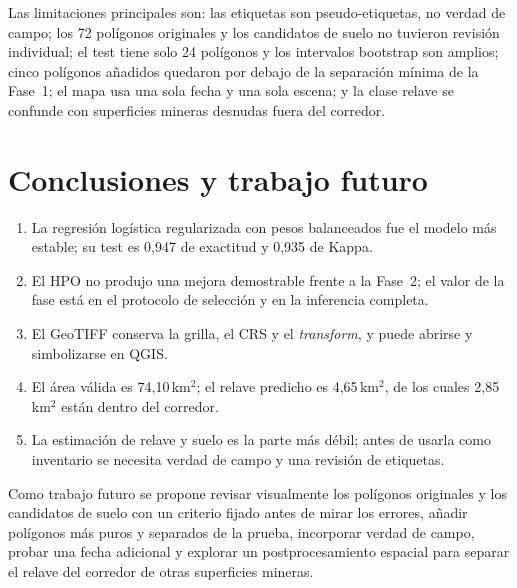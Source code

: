 \documentclass{article}
\begin{document}
Las limitaciones principales son: las etiquetas son pseudo-etiquetas, no verdad de campo; los 72 polígonos originales y los candidatos de suelo no tuvieron revisión individual; el test tiene solo 24 polígonos y los intervalos bootstrap son amplios; cinco polígonos añadidos quedaron por debajo de la separación mínima de la Fase~1; el mapa usa una sola fecha y una sola escena; y la clase relave se confunde con superficies mineras desnudas fuera del corredor.

\section{Conclusiones y trabajo futuro}
\begin{enumerate}
 \item La regresión logística regularizada con pesos balanceados fue el modelo más estable; su test es 0{,}947 de exactitud y 0{,}935 de Kappa.
 \item El HPO no produjo una mejora demostrable frente a la Fase~2; el valor de la fase está en el protocolo de selección y en la inferencia completa.
 \item El GeoTIFF conserva la grilla, el CRS y el \emph{transform}, y puede abrirse y simbolizarse en QGIS.
 \item El área válida es 74{,}10\,km$^2$; el relave predicho es 4{,}65\,km$^2$, de los cuales 2{,}85\,km$^2$ están dentro del corredor.
 \item La estimación de relave y suelo es la parte más débil; antes de usarla como inventario se necesita verdad de campo y una revisión de etiquetas.
\end{enumerate}

Como trabajo futuro se propone revisar visualmente los polígonos originales y los candidatos de suelo con un criterio fijado antes de mirar los errores, añadir polígonos más puros y separados de la prueba, incorporar verdad de campo, probar una fecha adicional y explorar un postprocesamiento espacial para separar el relave del corredor de otras superficies mineras.

\printbibliography
\end{document}
